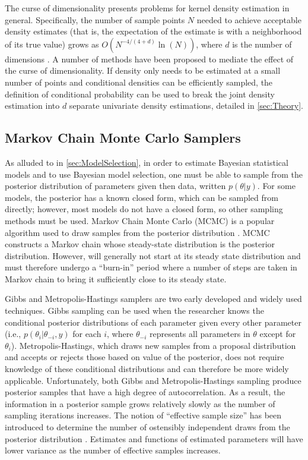 \documentclass[twocolumn]{article}
\begin{document}
The curse of dimensionality presents problems for kernel density estimation in general. Specifically, the number of sample points $N$ needed to achieve acceptable density estimates (that is, the expectation of the estimate is with a neighborhood of its true value) grows as $O\left(N^{-4/(4+d)}\ln(N)\right)$, where $d$ is the number of dimensions \citep{LiuLafferty}. A number of methods have been proposed to mediate the effect of the curse of dimensionality. If density only needs to be estimated at a small number of points and conditional densities can be efficiently sampled, the definition of conditional probability can be used to break the joint density estimation into $d$ separate univariate density estimations, detailed in \cref{sec:Theory}.

\subsection{Markov Chain Monte Carlo Samplers}

As alluded to in \cref{sec:ModelSelection}, in order to estimate Bayesian statistical models and to use Bayesian model selection, one must be able to sample from the posterior distribution of parameters given then data, written $p(\theta|y)$. For some models, the posterior has a known closed form, which can be sampled from directly; however, most models do not have a closed form, so other sampling methods must be used. Markov Chain Monte Carlo (MCMC) is a popular algorithm used to draw samples from the posterior distribution \citep{GelfandSmith}. MCMC constructs a Markov chain whose steady-state distribution is the posterior distribution. However, will generally not start at its steady state distribution and must therefore undergo a ``burn-in'' period where a number of steps are taken in Markov chain to bring it sufficiently close to its steady state.

Gibbs and Metropolis-Hastings samplers are two early developed and widely used techniques. Gibbs sampling can be used when the researcher knows the conditional posterior distributions of each parameter given every other parameter (i.e., $p(\theta_i|\theta_{-i}, y)$ for each $i$, where $\theta_{-i}$ represents all parameters in $\theta$ except for $\theta_i$). Metropolis-Hastings, which draws new samples from a proposal distribution and accepts or rejects those based on value of the posterior, does not require knowledge of these conditional distributions and can therefore be more widely applicable. Unfortunately, both Gibbs and Metropolis-Hastings sampling produce posterior samples that have a high degree of autocorrelation. As a result, the information in a posterior sample grows relatively slowly as the number of sampling iterations increases. The notion of ``effective sample size'' has been introduced to determine the number of ostensibly independent draws from the posterior distribution \citep{Lenth}. Estimates and functions of estimated parameters will have lower variance as the number of effective samples increases.
\end{document}
